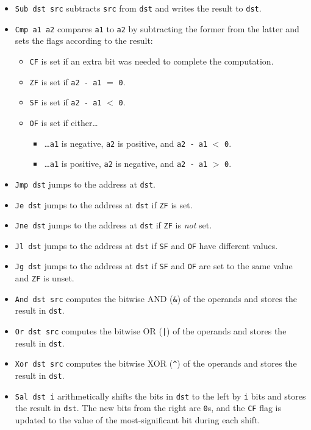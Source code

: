 \documentclass{article}
\begin{document}
{\begin{itemize}
    NOTE: The adding circuits do not even think about whether the numbers are
    signed or unsigned, because the addition is performed the same in both
    cases.
  \item \texttt{Sub dst src} subtracts \texttt{src} from \texttt{dst} and writes
    the result to \texttt{dst}.
  \item \texttt{Cmp a1 a2} compares \texttt{a1} to \texttt{a2} by subtracting
    the former from the latter and sets the flags according to the result:
    \begin{itemize}
    \item \texttt{CF} is set if an extra bit was needed to complete the
      computation.
    \item \texttt{ZF} is set if \texttt{a2 - a1} $=$ \texttt{0}.
    \item \texttt{SF} is set if \texttt{a2 - a1} $<$ \texttt{0}.
    \item \texttt{OF} is set if either\ldots
      \begin{itemize}
      \item \ldots\texttt{a1} is negative, \texttt{a2} is positive, and
        \texttt{a2 - a1} $<$ \texttt{0}.
      \item \ldots\texttt{a1} is positive, \texttt{a2} is negative, and
        \texttt{a2 - a1} $>$ \texttt{0}.
      \end{itemize}
    \end{itemize}
  \item \texttt{Jmp dst} jumps to the address at \texttt{dst}.
  \item \texttt{Je dst} jumps to the address at \texttt{dst} if \texttt{ZF} is
    set.
  \item \texttt{Jne dst} jumps to the address at \texttt{dst} if \texttt{ZF} is
    \emph{not} set.
  \item \texttt{Jl dst} jumps to the address at \texttt{dst} if \texttt{SF} and
    \texttt{OF} have different values.
  \item \texttt{Jg dst} jumps to the address at \texttt{dst} if \texttt{SF} and
    \texttt{OF} are set to the same value and \texttt{ZF} is unset.
  \item \texttt{And dst src} computes the bitwise AND (\texttt{\&{}}) of the
    operands and stores the result in \texttt{dst}.
  \item \texttt{Or dst src} computes the bitwise OR (\texttt{|}) of the operands
    and stores the result in \texttt{dst}.
  \item \texttt{Xor dst src} computes the bitwise XOR (\texttt{\^{}}) of the
    operands and stores the result in \texttt{dst}.
  \item \texttt{Sal dst i} arithmetically shifts the bits in \texttt{dst} to the
    left by \texttt{i} bits and stores the result in \texttt{dst}. The new bits
    from the right are \texttt{0}s, and the \texttt{CF} flag is updated to the
    value of the most-significant bit during each shift.


\end{itemize}}
\end{document}
